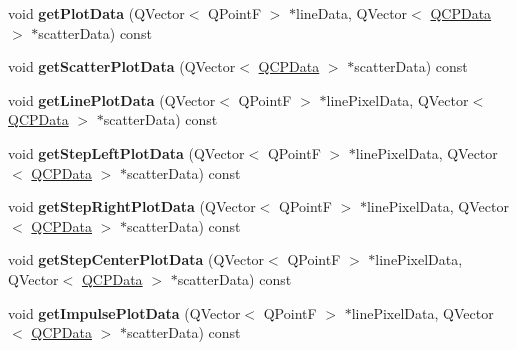 \begin{DoxyCompactItemize}
\item 
\hypertarget{classQCPGraph_a466c661e015188971c862031af946693}{}void {\bfseries get\+Plot\+Data} (Q\+Vector$<$ Q\+Point\+F $>$ $\ast$line\+Data, Q\+Vector$<$ \hyperlink{classQCPData}{Q\+C\+P\+Data} $>$ $\ast$scatter\+Data) const \label{classQCPGraph_a466c661e015188971c862031af946693}

\item 
\hypertarget{classQCPGraph_a45c4214b59ea11aa6d8d112bdc3b0e03}{}void {\bfseries get\+Scatter\+Plot\+Data} (Q\+Vector$<$ \hyperlink{classQCPData}{Q\+C\+P\+Data} $>$ $\ast$scatter\+Data) const \label{classQCPGraph_a45c4214b59ea11aa6d8d112bdc3b0e03}

\item 
\hypertarget{classQCPGraph_ae3d82ffd0c9a883482aabf47b0e6b5ee}{}void {\bfseries get\+Line\+Plot\+Data} (Q\+Vector$<$ Q\+Point\+F $>$ $\ast$line\+Pixel\+Data, Q\+Vector$<$ \hyperlink{classQCPData}{Q\+C\+P\+Data} $>$ $\ast$scatter\+Data) const \label{classQCPGraph_ae3d82ffd0c9a883482aabf47b0e6b5ee}

\item 
\hypertarget{classQCPGraph_a609cf4a78045b4d2a679bdff7623847e}{}void {\bfseries get\+Step\+Left\+Plot\+Data} (Q\+Vector$<$ Q\+Point\+F $>$ $\ast$line\+Pixel\+Data, Q\+Vector$<$ \hyperlink{classQCPData}{Q\+C\+P\+Data} $>$ $\ast$scatter\+Data) const \label{classQCPGraph_a609cf4a78045b4d2a679bdff7623847e}

\item 
\hypertarget{classQCPGraph_a3b9b8c8dc7a6fd9be6e253c25ee31809}{}void {\bfseries get\+Step\+Right\+Plot\+Data} (Q\+Vector$<$ Q\+Point\+F $>$ $\ast$line\+Pixel\+Data, Q\+Vector$<$ \hyperlink{classQCPData}{Q\+C\+P\+Data} $>$ $\ast$scatter\+Data) const \label{classQCPGraph_a3b9b8c8dc7a6fd9be6e253c25ee31809}

\item 
\hypertarget{classQCPGraph_ad3713e7d8eb85a0afc34a81a5db5cd27}{}void {\bfseries get\+Step\+Center\+Plot\+Data} (Q\+Vector$<$ Q\+Point\+F $>$ $\ast$line\+Pixel\+Data, Q\+Vector$<$ \hyperlink{classQCPData}{Q\+C\+P\+Data} $>$ $\ast$scatter\+Data) const \label{classQCPGraph_ad3713e7d8eb85a0afc34a81a5db5cd27}

\item 
\hypertarget{classQCPGraph_a1ca2b0762505767f116892609fb02062}{}void {\bfseries get\+Impulse\+Plot\+Data} (Q\+Vector$<$ Q\+Point\+F $>$ $\ast$line\+Pixel\+Data, Q\+Vector$<$ \hyperlink{classQCPData}{Q\+C\+P\+Data} $>$ $\ast$scatter\+Data) const \label{classQCPGraph_a1ca2b0762505767f116892609fb02062}


\end{DoxyCompactItemize}

